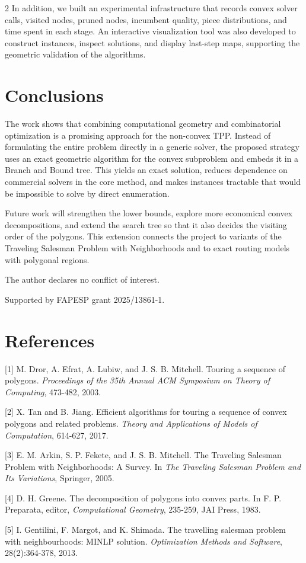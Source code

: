 \documentclass[10pt,a4paper]{article}
\begin{document}
\begin{multicols}{2}
In addition, we built an experimental infrastructure that records convex solver calls, visited nodes, pruned nodes, incumbent quality, piece distributions, and time spent in each stage. An interactive visualization tool was also developed to construct instances, inspect solutions, and display last-step maps, supporting the geometric validation of the algorithms.

\section{Conclusions}

The work shows that combining computational geometry and combinatorial optimization is a promising approach for the non-convex TPP. Instead of formulating the entire problem directly in a generic solver, the proposed strategy uses an exact geometric algorithm for the convex subproblem and embeds it in a Branch and Bound tree. This yields an exact solution, reduces dependence on commercial solvers in the core method, and makes instances tractable that would be impossible to solve by direct enumeration.

Future work will strengthen the lower bounds, explore more economical convex decompositions, and extend the search tree so that it also decides the visiting order of the polygons. This extension connects the project to variants of the Traveling Salesman Problem with Neighborhoods and to exact routing models with polygonal regions.

The author declares no conflict of interest.

Supported by FAPESP grant 2025/13861-1.

\section{References}

[1] M. Dror, A. Efrat, A. Lubiw, and J. S. B. Mitchell. Touring a sequence of polygons. \textit{Proceedings of the 35th Annual ACM Symposium on Theory of Computing}, 473-482, 2003.

[2] X. Tan and B. Jiang. Efficient algorithms for touring a sequence of convex polygons and related problems. \textit{Theory and Applications of Models of Computation}, 614-627, 2017.

[3] E. M. Arkin, S. P. Fekete, and J. S. B. Mitchell. The Traveling Salesman Problem with Neighborhoods: A Survey. In \textit{The Traveling Salesman Problem and Its Variations}, Springer, 2005.

[4] D. H. Greene. The decomposition of polygons into convex parts. In F. P. Preparata, editor, \textit{Computational Geometry}, 235-259, JAI Press, 1983.

[5] I. Gentilini, F. Margot, and K. Shimada. The travelling salesman problem with neighbourhoods: MINLP solution. \textit{Optimization Methods and Software}, 28(2):364-378, 2013.

\end{multicols}
\end{document}
